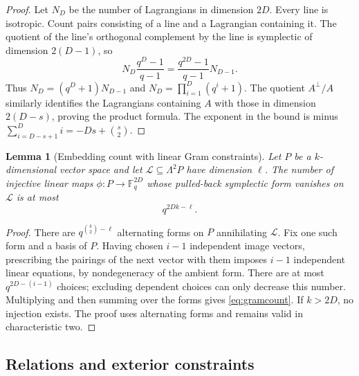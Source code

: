 \documentclass[11pt]{article}
\newtheorem{lemma}[theorem]{Lemma}
\theoremstyle{definition}
\theoremstyle{remark}
\newcommand{\Fq}{\mathbb F_q}
\newcommand{\1}{\mathbf 1}
\begin{document}
\begin{proof}
Let $N_D$ be the number of Lagrangians in dimension $2D$.
Every line is isotropic. Count pairs consisting of a line and a Lagrangian
containing it. The quotient of the line's orthogonal complement by the line is
symplectic of dimension $2(D-1)$, so
\[
 N_D\frac{q^D-1}{q-1}=\frac{q^{2D}-1}{q-1}N_{D-1}.
\]
Thus $N_D=(q^D+1)N_{D-1}$ and $N_D=\prod_{i=1}^D(q^i+1)$.
The quotient $A^\perp/A$ similarly identifies the Lagrangians containing $A$
with those in dimension $2(D-s)$, proving the product formula.
The exponent in the bound is minus
$\sum_{i=D-s+1}^D i=-Ds+\binom{s}{2}$.
\end{proof}

\begin{lemma}[Embedding count with linear Gram constraints]
\label{lem:gram}
Let $P$ be a $k$-dimensional vector space and let
$\mathcal L\subseteq\Lambda^2P$ have dimension $\ell$.
The number of injective linear maps $\phi:P\to\Fq^{2D}$ whose pulled-back
symplectic form vanishes on $\mathcal L$ is at most
\begin{equation}
 q^{2Dk-\ell}.
 \label{eq:gramcount}
\end{equation}
\end{lemma}

\begin{proof}
There are $q^{\binom{k}{2}-\ell}$ alternating forms on $P$ annihilating
$\mathcal L$. Fix one such form and a basis of $P$. Having chosen $i-1$
independent image vectors, prescribing the pairings of the next vector with
them imposes $i-1$ independent linear equations, by nondegeneracy of the
ambient form. There are at most $q^{2D-(i-1)}$ choices; excluding dependent
choices can only decrease this number. Multiplying and then summing over the
forms gives \eqref{eq:gramcount}. If $k>2D$, no injection exists.
The proof uses alternating forms and remains valid in characteristic two.
\end{proof}

\subsection{Relations and exterior constraints}
\end{document}

